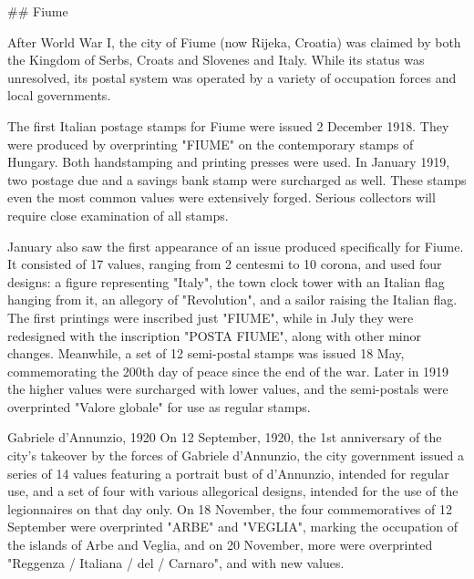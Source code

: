 \#\# Fiume

After World War I, the city of Fiume (now Rijeka, Croatia) was claimed by both the Kingdom of Serbs, Croats and Slovenes and Italy. While its status was unresolved, its postal system was operated by a variety of occupation forces and local governments.









The first Italian postage stamps for Fiume were issued 2 December 1918. They were produced by overprinting "FIUME" on the contemporary stamps of Hungary. Both handstamping and printing presses were used. In January 1919, two postage due and a savings bank stamp were surcharged as well. These stamps even the most common values were extensively forged. Serious collectors will require close examination of all stamps.



January also saw the first appearance of an issue produced specifically for Fiume. It consisted of 17 values, ranging from 2 centesmi to 10 corona, and used four designs: a figure representing "Italy", the town clock tower with an Italian flag hanging from it, an allegory of "Revolution", and a sailor raising the Italian flag. The first printings were inscribed just "FIUME", while in July they were redesigned with the inscription "POSTA FIUME", along with other minor changes. Meanwhile, a set of 12 semi-postal stamps was issued 18 May, commemorating the 200th day of peace since the end of the war.
Later in 1919 the higher values were surcharged with lower values, and the semi-postals were overprinted "Valore globale" for use as regular stamps.




Gabriele d'Annunzio, 1920
On 12 September, 1920, the 1st anniversary of the city's takeover by the forces of Gabriele d'Annunzio, the city government issued a series of 14 values featuring a portrait bust of d'Annunzio, intended for regular use, and a set of four with various allegorical designs, intended for the use of the legionnaires on that day only.
On 18 November, the four commemoratives of 12 September were overprinted "ARBE" and "VEGLIA", marking the occupation of the islands of Arbe and Veglia, and on 20 November, more were overprinted "Reggenza / Italiana / del / Carnaro", and with new values.

